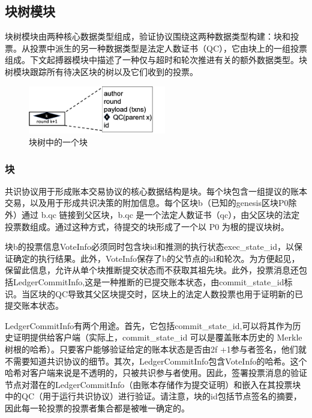 \subsection{块树模块}

块树模块由两种核心数据类型组成，验证协议围绕这两种数据类型构建：块和投票。从投票中派生的另一种数据类型是法定人数证书（QC），它由块上的一组投票组成。下文起搏器模块中描述了一种仅与超时和轮次推进有关的额外数据类型。块树模块跟踪所有待决区块的树以及它们收到的投票。

\begin{figure}[htbp]
    \centering
    \includegraphics[width=6cm]{figures/image5.png}
    \caption{块树中的一个块}
    \label{image5}
\end{figure}

\subsubsection{块}

共识协议用于形成账本交易协议的核心数据结构是块。每个块包含一组提议的账本交易，以及用于形成共识决策的附加信息。每个区块b（已知的genesis区块P0除外）通过 b.qc 链接到父区块，b.qc 是一个法定人数证书（qc），由父区块的法定投票数组成。通过这种方式，待提交的块形成了一个以 P0 为根的提议块树。

块b的投票信息VoteInfo必须同时包含块id和推测的执行状态exec\_state\_id，以保证确定的执行结果。此外，VoteInfo保存了b的父节点的id和轮次。为方便起见，保留此信息，允许从单个块推断提交状态而不获取其祖先块。此外，投票消息还包括LedgerCommitInfo,这是一种推断的已提交账本状态，由commit\_state\_id标识。当区块的QC导致其父区块提交时，区块上的法定人数投票也用于证明新的已提交账本状态。

LedgerCommitInfo有两个用途。首先，它包括commit\_state\_id,可以将其作为历史证明提供给客户端（实际上，commit\_state\_id 可以是覆盖账本历史的 Merkle树根的哈希）。只要客户能够验证给定的账本状态是否由2f +1参与者签名，他们就不需要知道共识协议的细节。其次，LedgerCommitInfo包含VoteInfo的哈希。这个哈希对客户端来说是不透明的，只被共识参与者使用。因此，签署投票消息的验证节点对潜在的LedgerCommitInfo（由账本存储作为提交证明）和嵌入在其投票块中的QC（用于运行共识协议）进行验证。请注意，块的id包括节点签名的摘要，因此每一轮投票的投票者集合都是被唯一确定的。

